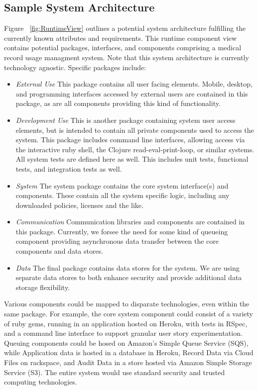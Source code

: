 \documentclass[10pt, conference, compsocconf]{IEEEtran}
\begin{document}
\subsection{Sample System Architecture}
Figure ~\ref{fig:RuntimeView} outlines a potential system architecture fulfilling the currently known attributes and requirements.  This runtime component view contains potential packages, interfaces, and components comprising a medical record usage managment system.  Note that this system architecture is currently technology agnostic.  Specific packages include:

\begin{itemize}

\item \textit{External Use} This package contains all user facing elements.  Mobile, desktop, and programming interfaces accessed by external users are contained in this package, as are all components providing this kind of functionality.

\item \textit{Development Use} This is another package containing system user access elements, but is intended to contain all private components used to access the system.  This package includes command line interfaces, allowing access via the interactive ruby shell, the Clojure read-eval-print-loop, or similar systems.  All system tests are defined here as well.  This includes unit tests, functional tests, and integration tests as well.

\item \textit{System} The system package contains the core system interface(s) and components.  These contain all the system specific logic, including any downloaded policies, licenses and the like.

\item \textit{Communication} Communication libraries and components are contained in this package.  Currently, we forsee the need for some kind of queueing component providing asynchronous data transfer between the core components and data stores.

\item \textit{Data} The final package contains data stores for the system.  We are using separate data stores to both enhance security and provide additional data storage flexibility.

\end{itemize}

Various components could be mapped to disparate technologies, even within the same package.  For example, the core system component could consist of a variety of ruby gems, running in an application hosted on Heroku, with tests in RSpec, and a command line interface to support granular user story experimentation.  Queuing components could be hosed on Amazon's Simple Queue Service (SQS), while Application data is hosted in a database in Heroku, Record Data via Cloud Files on rackspace, and Audit Data in a store hosted via Amazon Simple Storage Service (S3).  The entire system would use standard security and trusted computing technologies.
\end{document}
